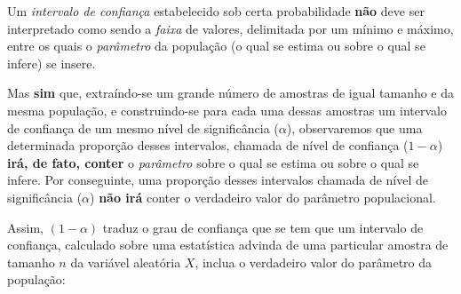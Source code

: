 \documentclass[
]{book}
\begin{document}
\hfill\break

Um \emph{intervalo de confiança} estabelecido sob certa probabilidade \textbf{não} deve ser interpretado como sendo a \emph{faixa} de valores, delimitada por um mínimo e máximo, entre os quais o \emph{parâmetro} da população (o qual se estima ou sobre o qual se infere) se insere.

\hfill\break

Mas \textbf{sim} que, extraíndo-se um grande número de amostras de igual tamanho e da mesma população, e construindo-se para cada uma dessas amostras um intervalo de confiança de um mesmo nível de significância (\(\alpha\)), observaremos que uma determinada proporção desses intervalos, chamada de nível de confiança (\(1-\alpha\)) \textbf{irá, de fato, conter} o \emph{parâmetro} sobre o qual se estima ou sobre o qual se infere. Por conseguinte, uma proporção desses intervalos chamada de nível de significância (\(\alpha\)) \textbf{não irá} conter o verdadeiro valor do parâmetro populacional.

\hfill\break

Assim, \((1-\alpha)\) traduz o grau de confiança que se tem que um intervalo de confiança, calculado sobre uma estatística advinda de uma particular amostra de tamanho \(n\) da variável aleatória \(X\), inclua o verdadeiro valor do parâmetro da população:

\hfill\break
\end{document}
